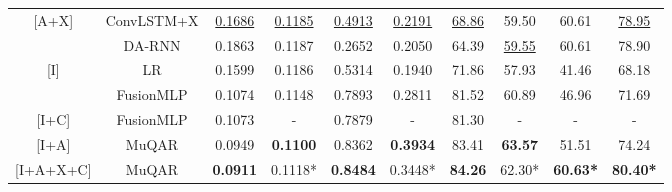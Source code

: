 \documentclass{article}
\begin{document}
\begin{table*}
\begin{tabular}{cc|cc|cc|ccc|c}
    \midrule
    
    \multirow{2}{*}{[A+X]} & ConvLSTM+X & \underline{0.1686} & \underline{0.1185} & \underline{0.4913} & \underline{0.2191} & \underline{68.86} & 59.50 & 60.61 & \underline{78.95} \\
    & DA-RNN & 0.1863 & 0.1187 & 0.2652 & 0.2050 & 64.39 & \underline{59.55} & 60.61 & 78.90 \\
    
    \midrule
    
    \multirow{2}{*}{[I]} &
    LR & 0.1599 & 0.1186 & 0.5314 & 0.1940 & 71.86 & 57.93 & 41.46 & 68.18 \\
    
    &
    FusionMLP & 0.1074 & 0.1148 & 0.7893 & 0.2811 & 81.52 & 60.89 & 46.96 & 71.69 \\
    
    \midrule
    
    [I+C] & FusionMLP & 0.1073 & - & 0.7879 & - & 81.30 & - & - & - \\
        
    \midrule
    
    [I+A] &
    MuQAR & 0.0949 & \textbf{0.1100} & 0.8362 & \textbf{0.3934} & 83.41 & \textbf{63.57} & 51.51 & 74.24 \\
    
    \midrule
    
    [I+A+X+C] &
    MuQAR & \textbf{0.0911} & 0.1118* & \textbf{0.8484} & 0.3448* & \textbf{84.26} & 62.30* & \textbf{60.63*} & \textbf{80.40*} \\
    
    

    \bottomrule
  \end{tabular}
\end{table*}
\end{document}
